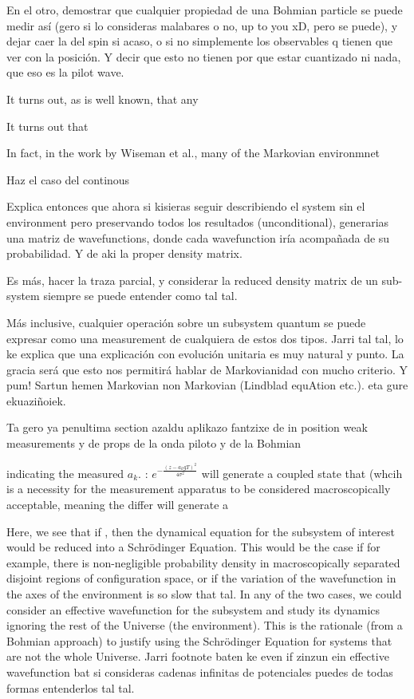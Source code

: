 \documentclass[11pt, a4paper]{article} %
\begin{document}
En el otro, demostrar que cualquier propiedad de una Bohmian particle se puede medir así (gero si lo consideras malabares o no, up to you xD, pero se puede), y dejar caer la del spin si acaso, o si no simplemente los observables q tienen que ver con la posición. Y decir que esto no tienen por que estar cuantizado ni nada, que eso es la pilot wave.





 

It turns out, as is well known, that any 

It turns out that 

In fact, in the work \cite{MarkovianityDefs} by Wiseman et al., many of the Markovian environmnet

Haz el caso del continous

Explica entonces que ahora si kisieras seguir describiendo el system sin el environment pero preservando todos los resultados (unconditional), generarias una matriz de wavefunctions, donde cada wavefunction iría acompañada de su probabilidad. Y de aki la proper density matrix.

Es más, hacer la traza parcial, y considerar la reduced density matrix de un sub-system siempre se puede entender como tal tal.

Más inclusive, cualquier operación sobre un subsystem quantum se puede expresar como una measurement de cualquiera de estos dos tipos. Jarri tal tal, lo ke explica que una explicación con evolución unitaria es muy natural y punto. La gracia será que esto nos permitirá hablar de Markovianidad con mucho criterio. Y pum! Sartun hemen Markovian non Markovian (Lindblad equAtion etc.). eta gure ekuaziñoiek.

Ta gero ya penultima section azaldu aplikazo fantzixe de in position weak measurements y de props de la onda piloto y de la Bohmian


 indicating the measured $a_k$. : $e^{-\frac{(z-a_kgT)^2}{4\sigma^2}}$ will generate a coupled state that  (whcih is a necessity for the measurement apparatus to be considered macroscopically acceptable, meaning the differ will generate a 


Here, we see that if , then the dynamical equation for the subsystem of interest would be reduced into a Schrödinger Equation. This would be the case if for example, there is non-negligible probability density in macroscopically separated disjoint regions of configuration space, or if the variation of the wavefunction in the axes of the environment is so slow that tal. In any of the two cases, we could consider an effective wavefunction for the subsystem and study its dynamics ignoring the rest of the Universe (the environment). This is the rationale (from a Bohmian approach) to justify using the Schrödinger Equation for systems that are not the whole Universe. Jarri footnote baten ke even if zinzun ein effective wavefunction bat si consideras cadenas infinitas de potenciales puedes de todas formas entenderlos tal tal.
\end{document}
